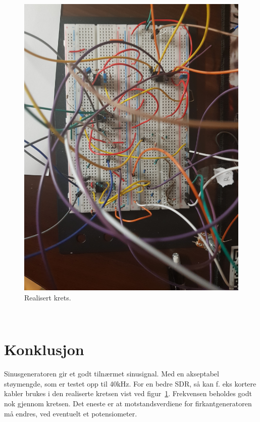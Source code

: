 \documentclass[a4paper,11pt,norsk]{article}
\begin{document}
\begin{figure}[htbp]
    \centering
    \includegraphics[width=1.0\textwidth]{img/20210606_001211.jpg}
    \caption{Realisert krets.}
    \label{fig:real_krets}
\end{figure}\\
\newpage

\section{Konklusjon}
\label{sec:konklusjon}
Sinusgeneratoren gir et godt tilnærmet sinusignal. Med en akseptabel støymengde, som er testet opp til 40kHz.
For en bedre SDR, så kan f. eks kortere kabler brukes i den realiserte kretsen vist ved figur~\ref{fig:real_krets}.
Frekvensen beholdes godt nok gjennom kretsen. Det eneste er at motstandsverdiene for firkantgeneratoren må endres, ved eventuelt et potensiometer. 
\end{document}
